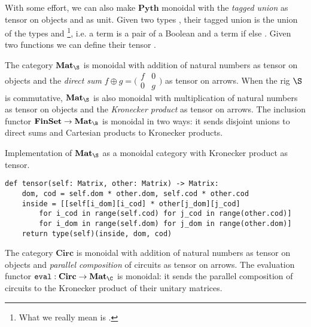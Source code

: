 \begin{example}
With some effort, we can also make $\mathbf{Pyth}$ monoidal with the \emph{tagged union} as tensor on objects and  as unit.
Given two types , their tagged union  is the union of the types  and \footnote
{What we really mean is .}, i.e. a term  is a pair of a Boolean  and a term  if  else .
Given two functions  we can define their tensor .
\end{example}

\begin{example}
The category $\mathbf{Mat}_\S$ is monoidal with addition of natural numbers as tensor on objects and the \emph{direct sum} $f \oplus g = \big(\begin{smallmatrix}f & 0\\ 0 & g\end{smallmatrix}\big)$ as tensor on arrows.
When the rig $\S$ is commutative, $\mathbf{Mat}_\S$ is also monoidal with multiplication of natural numbers as tensor on objects and the \emph{Kronecker product} as tensor on arrows.
The inclusion functor $\mathbf{FinSet} \to \mathbf{Mat}_\B$ is monoidal in two ways: it sends disjoint unions to direct sums and Cartesian products to Kronecker products.
\end{example}

\begin{python}
{\normalfont Implementation of $\mathbf{Mat}_\S$ as a monoidal category with Kronecker product as tensor.}

\begin{verbatim}
def tensor(self: Matrix, other: Matrix) -> Matrix:
    dom, cod = self.dom * other.dom, self.cod * other.cod
    inside = [[self[i_dom][i_cod] * other[j_dom][j_cod]
        for i_cod in range(self.cod) for j_cod in range(other.cod)]
        for i_dom in range(self.dom) for j_dom in range(other.dom)]
    return type(self)(inside, dom, cod)
\end{verbatim}
\end{python}

\begin{example}
The category $\mathbf{Circ}$ is monoidal with addition of natural numbers as tensor on objects and \emph{parallel composition} of circuits as tensor on arrows.
The evaluation functor $\mathtt{eval} : \mathbf{Circ} \to \mathbf{Mat}_\C$ is monoidal: it sends the parallel composition of circuits to the Kronecker product of their unitary matrices.
\end{example}

